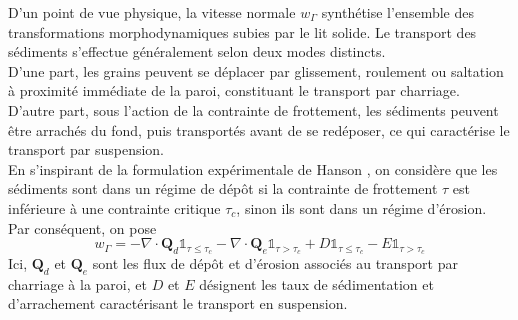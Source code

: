 \documentclass[11pt, a4paper, oneside]{report}
\begin{document}
D'un point de vue physique, la vitesse normale $w_\Gamma$ synthétise l'ensemble des transformations morphodynamiques subies par le lit solide. Le transport des sédiments s'effectue généralement selon deux modes distincts. \\
D'une part, les grains peuvent se déplacer par glissement, roulement ou saltation à proximité immédiate de la paroi, constituant le transport par charriage. \\
D'autre part, sous l'action de la contrainte de frottement, les sédiments peuvent être arrachés du fond, puis transportés avant de se redéposer, ce qui caractérise le transport par suspension. \\
En s'inspirant de la formulation expérimentale de Hanson \cite{hanson1991development}, on considère que les sédiments sont dans un régime de dépôt si la contrainte de frottement $\tau$ est inférieure à une contrainte critique $\tau_c$, sinon ils sont dans un régime d'érosion. \\
Par conséquent, on pose
\begin{equation}
    w_\Gamma = - \nabla \cdot \bm{Q}_d \mathds{1}_{\tau \leq \tau_c} - \nabla \cdot \bm{Q}_e \mathds{1}_{\tau > \tau_c} + D \mathds{1}_{\tau \leq \tau_c} - E \mathds{1}_{\tau > \tau_c}
\end{equation}
Ici, $\bm{Q}_d$ et $\bm{Q}_e$ sont les flux de dépôt et d'érosion associés au transport par charriage à la paroi, et $D$ et $E$ désignent les taux de sédimentation et d'arrachement caractérisant le transport en suspension. \\
\end{document}
